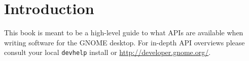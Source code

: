 \chapter{Introduction}

This book is meant to be a high-level guide to what APIs are available when writing software for the GNOME desktop.
For in-depth API overviews please consult your local \verb|devhelp| install or \url{http://developer.gnome.org/}.
